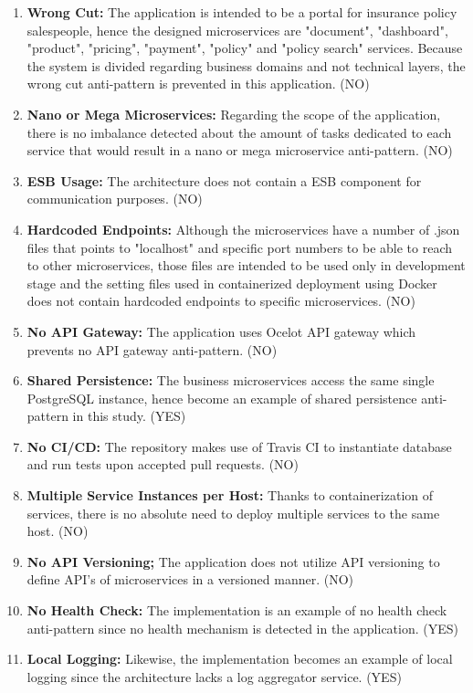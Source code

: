 \documentclass{Configuration_Files/PoliMi3i_thesis}
\begin{document}
\begin{enumerate}
    \item \textbf{Wrong Cut:} The application is intended to be a portal for insurance policy salespeople, hence the designed microservices are "document", "dashboard", "product", "pricing", "payment", "policy" and "policy search" services.
    Because the system is divided regarding business domains and not technical layers, the wrong cut anti-pattern is prevented in this application. (NO)
    
    \item \textbf{Nano or Mega Microservices:} Regarding the scope of the application, there is no imbalance detected about the amount of tasks dedicated to each service that would result in a nano or mega microservice anti-pattern. (NO)
    
    \item \textbf{ESB Usage:} The architecture does not contain a ESB component for communication purposes. (NO)
    
    \item \textbf{Hardcoded Endpoints:} Although the microservices have a number of .json files that points to "localhost" and specific port numbers to be able to reach to other microservices, those files are intended to be used only in development stage and the setting files used in containerized deployment using Docker does not contain hardcoded endpoints to specific microservices. (NO)
    
    \item \textbf{No API Gateway:} The application uses Ocelot API gateway which prevents no API gateway anti-pattern. (NO)
    
    \item \textbf{Shared Persistence:} The business microservices access the same single PostgreSQL instance, hence become an example of shared persistence anti-pattern in this study. (YES)
    
    \item \textbf{No CI/CD:} The repository makes use of Travis CI to instantiate database and run tests upon accepted pull requests. (NO)
    
    \item \textbf{Multiple Service Instances per Host:} Thanks to containerization of services, there is no absolute need to deploy multiple services to the same host. (NO)
    
    \item \textbf{No API Versioning;} The application does not utilize API versioning to define API's of microservices in a versioned manner. (NO)
    
    \item \textbf{No Health Check:} The implementation is an example of no health check anti-pattern since no health mechanism is detected in the application. (YES)
    
    \item \textbf{Local Logging:} Likewise, the implementation becomes an example of local logging since the architecture lacks a log aggregator service. (YES)
\end{enumerate}
\end{document}
